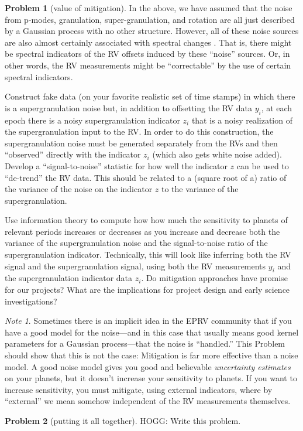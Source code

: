 \documentclass{article}
\theoremstyle{definition}
\newcommand{\problemname}{Problem}
\newtheorem{problem}{\problemname}
\theoremstyle{remark}
\newcommand{\notename}{Note}
\newtheorem{note}{\notename}[problem]
\begin{document}
\begin{problem}[value of mitigation]
In the above, we have assumed that the noise from p-modes, granulation, super-granulation, and rotation are all just described by a Gaussian process with no other structure.
However, all of these noise sources are also almost certainly associated with spectral changes \cite{hamratio}.
That is, there might be spectral indicators of the RV offsets induced by these ``noise'' sources.
Or, in other words, the RV measurements might be ``correctable'' by the use of certain spectral indicators.

Construct fake data (on your favorite realistic set of time stamps) in which there is a supergranulation noise but, in addition to offsetting the RV data $y_i$, at each epoch there is a noisy supergranulation indicator $z_i$ that is a noisy realization of the supergranulation input to the RV.
In order to do this construction, the supergranulation noise must be generated separately from the RVs and then ``observed'' directly with the indicator $z_i$ (which also gets white noise added).
Develop a ``signal-to-noise'' statistic for how well the indicator $z$ can be used to ``de-trend'' the RV data.
This should be related to a (square root of a) ratio of the variance of the noise on the indicator $z$ to the variance of the supergranulation.

Use information theory to compute how how much the sensitivity to planets of relevant periods increases or decreases as you increase and decrease both the variance of the supergranulation noise and the signal-to-noise ratio of the supergranulation indicator.
Technically, this will look like inferring both the RV signal and the supergranulation signal, using both the RV measurements $y_i$ and the supergranulation indicator data $z_i$.
Do mitigation approaches have promise for our projects?
What are the implications for project design and early science investigations?
\end{problem}

\begin{note}
Sometimes there is an implicit idea in the EPRV community that if you have a good model for the noise---and in this case that usually means good kernel parameters for a Gaussian process---that the noise is ``handled.''
This \problemname{} should show that this is not the case:
Mitigation is far more effective than a noise model.
A good noise model gives you good and believable \emph{uncertainty estimates} on your planets, but it doesn't increase your sensitivity to planets.
If you want to increase sensitivity, you must mitigate, using external indicators, where by ``external'' we mean somehow independent of the RV measurements themselves.
\end{note}

\begin{problem}[putting it all together]
HOGG: Write this problem.
\end{problem}
\end{document}
